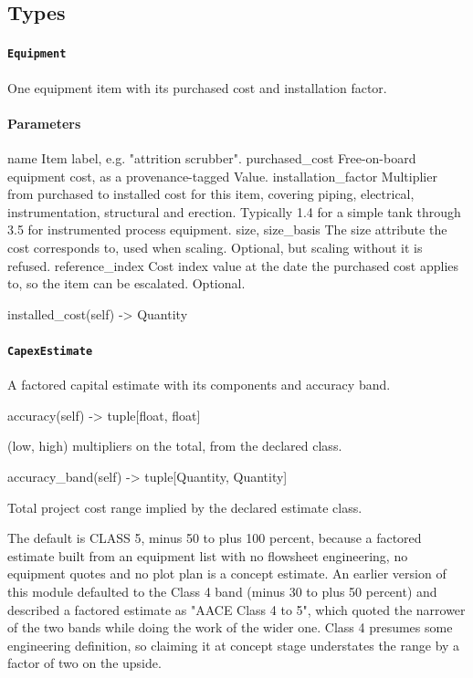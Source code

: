 \documentclass[10pt,a4paper,twoside]{report}
\begin{document}
\subsection*{Types}

\paragraph{\texttt{Equipment}}

One equipment item with its purchased cost and installation factor.

\paragraph*{Parameters}

name Item label, e.g. "attrition scrubber". purchased\_cost Free-on-board equipment cost, as a provenance-tagged Value. installation\_factor Multiplier from purchased to installed cost for this item, covering piping, electrical, instrumentation, structural and erection. Typically 1.4 for a simple tank through 3.5 for instrumented process equipment. size, size\_basis The size attribute the cost corresponds to, used when scaling. Optional, but scaling without it is refused. reference\_index Cost index value at the date the purchased cost applies to, so the item can be escalated. Optional.

\begin{verbatimsmall}
installed_cost(self) -> Quantity
\end{verbatimsmall}

\paragraph{\texttt{CapexEstimate}}

A factored capital estimate with its components and accuracy band.

\begin{verbatimsmall}
accuracy(self) -> tuple[float, float]
\end{verbatimsmall}

(low, high) multipliers on the total, from the declared class.

\begin{verbatimsmall}
accuracy_band(self) -> tuple[Quantity, Quantity]
\end{verbatimsmall}

Total project cost range implied by the declared estimate class.

The default is CLASS 5, minus 50 to plus 100 percent, because a factored estimate built from an equipment list with no flowsheet engineering, no equipment quotes and no plot plan is a concept estimate. An earlier version of this module defaulted to the Class 4 band (minus 30 to plus 50 percent) and described a factored estimate as "AACE Class 4 to 5", which quoted the narrower of the two bands while doing the work of the wider one. Class 4 presumes some engineering definition, so claiming it at concept stage understates the range by a factor of two on the upside.
\end{document}
